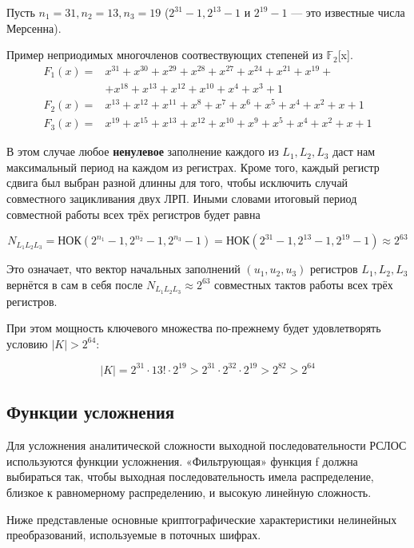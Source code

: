 \documentclass[a4paper,12pt]{article}
\theoremstyle{definition}
\begin{document}
	Пусть $n_1=31, n_2=13, n_3=19$ ($2^{31}-1, 2^{13}-1$ и $2^{19}-1$ --- это известные числа Мерсенна).
	
	Пример неприодимых многочленов соотвествующих степеней из $\mathbb{F}_2$[x].
	\begin{align*}
		F_1(x) =& x^{31} + x^{30} + x^{29} + x^{28} + x^{27} + x^{24} + x^{21} + x^{19} + \\
			    &+ x^{18} + x^{13} + x^{12} + x^{10} + x^4 + x^3 + 1 \\[2ex]
		F_2(x) =& x^{13} + x^{12} + x^{11} + x^8 + x^7 + x^6 + x^5 + x^4 + x^2 + x + 1 \\[2ex]
		F_3(x) =& x^{19} + x^{15} + x^{13} + x^{12} + x^{10} + x^9 + x^5 + x^4 + x^2 + x + 1 
	\end{align*}
	
	В этом случае любое \textbf{ненулевое} заполнение каждого из $L_1, L_2, L_3$ даст нам максимальный период на каждом из регистрах. Кроме того, каждый регистр сдвига был выбран разной длинны для того, чтобы исключить случай совместного зацикливания двух ЛРП. Иными словами итоговый период совместной работы всех трёх регистров будет равна 
	
	\[ N_{L_1 L_2 L_3} = \text{НОК}(2^{n_1}-1, 2^{n_2}-1, 2^{n_3}-1) = \text{НОК}(2^{31}-1, 2^{13}-1, 2^{19}-1) \approx 2^{63} \]

	Это означает, что вектор начальных заполнений $(u_1, u_2, u_3)$ регистров $L_1, L_2, L_3$ вернётся в сам в себя после $N_{L_1 L_2 L_3} \approx 2^{63} $ совместных тактов работы всех трёх регистров.
	
	При этом мощность ключевого множества по-прежнему будет удовлетворять условию $|K| > 2^{64}$:
	
	\[ |K| = 2^{31} \cdot 13! \cdot 2^{19} > 2^{31} \cdot 2^{32} \cdot 2^{19} > 2^{82} > 2^{64} \]
	
	\subsection{Функции усложнения} \label{Функции усложнения}
	
	Для усложнения аналитической сложности выходной	последовательности РСЛОС используются функции усложнения. «Фильтрующая» функция f должна выбираться так, чтобы выходная последовательность имела распределение, близкое к равномерному распределению, и высокую линейную сложность.

	
	Ниже представленые основные криптографические характеристики нелинейных преобразований, используемые в поточных шифрах.
	
\end{document}

